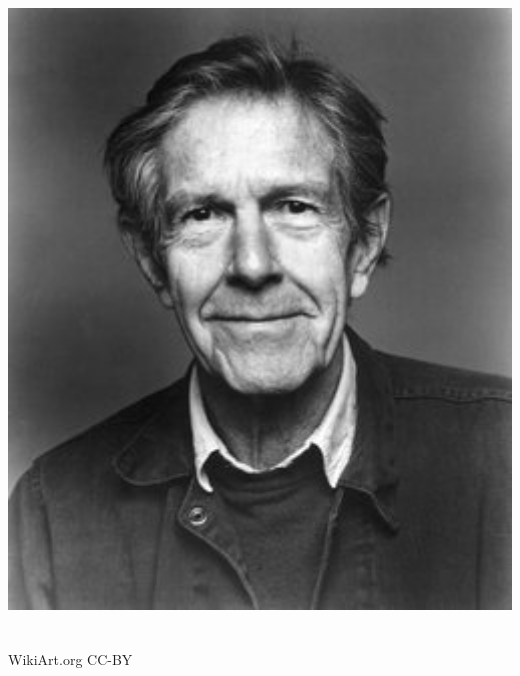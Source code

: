 \documentclass[17pt]{extarticle}
\begin{document}
\begin{center}
  \includegraphics[height=7in]{images/john-cage-portrait.jpg}\\
  {\small WikiArt.org CC-BY }
\end{center}

\newpage

\end{document}
